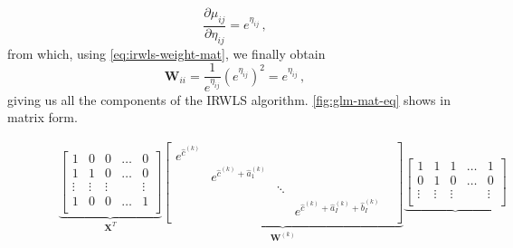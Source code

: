 \documentclass[a4paper]{book}
\begin{document}
\begin{equation}
  \frac{\partial \mu_{ij}}{\partial \eta_{ij}} = e^{\eta_{ij}} \,,
\end{equation}
from which, using \cref{eq:irwls-weight-mat}, we finally obtain
\begin{equation}
  \mathbf{W}_{ii} = \frac{1}{e^{\eta_{ij}}} (e^{\eta_{ij}})^2 = e^{\eta_{ij}} \,,
\end{equation}
giving us all the components of the IRWLS algorithm. \cref{fig:glm-mat-eq} shows in matrix form.

\begin{figure}
  \centering
  \large
  \begin{displaymath}
    \begin{split}
      &\underbrace{
        \begin{bmatrix}
          1      & 0      & 0      & \dots & 0      \\
          1      & 1      & 0      & \dots & 0      \\
          \vdots & \vdots & \vdots &       & \vdots \\
          1      & 0      & 0      & \dots & 1      \\
        \end{bmatrix}
      }_{\mathbf{X}^T}
      \underbrace{
        \begin{bmatrix}
          e^{\widehat{c}^{(k)}} &                                             &        &                                                                     \\
                                & e^{\widehat{c}^{(k)} + \widehat{a}^{(k)}_1} &        &                                                                   & \\
                                &                                             & \ddots &                                                                     \\
                                &                                             &        & e^{\widehat{c}^{(k)} + \widehat{a}^{(k)}_I + \widehat{b}^{(k)}_I}   \\
        \end{bmatrix}
      }_{\mathbf{W}^{(k)}}
      \underbrace{
        \begin{bmatrix}
          1      & 1      & 1      & \dots & 1      \\
          0      & 1      & 0      & \dots & 0      \\
          \vdots & \vdots & \vdots &       & \vdots \\

\end{bmatrix}}
\end{split}
\end{displaymath}
\end{figure}
\end{document}

